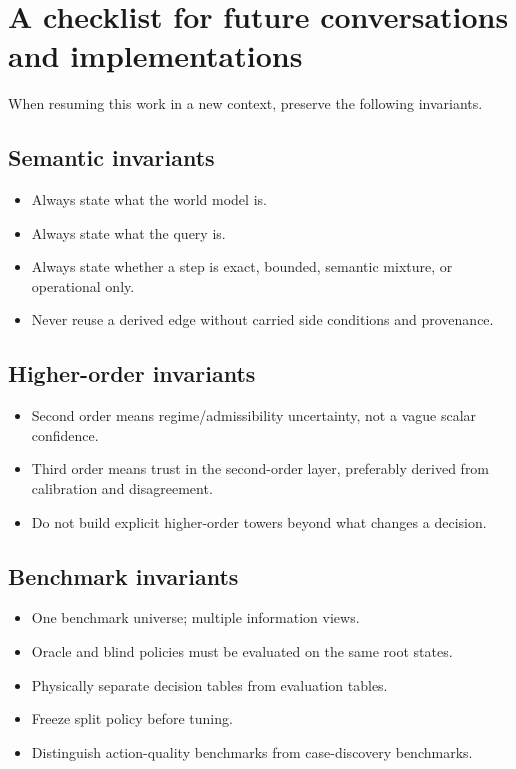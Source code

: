 \documentclass[11pt]{article}
\begin{document}
\section{A checklist for future conversations and implementations}
When resuming this work in a new context, preserve the following invariants.

\subsection*{Semantic invariants}
\begin{itemize}
    \item Always state what the world model is.
    \item Always state what the query is.
    \item Always state whether a step is exact, bounded, semantic mixture, or operational only.
    \item Never reuse a derived edge without carried side conditions and provenance.
\end{itemize}

\subsection*{Higher-order invariants}
\begin{itemize}
    \item Second order means regime/admissibility uncertainty, not a vague scalar confidence.
    \item Third order means trust in the second-order layer, preferably derived from calibration and disagreement.
    \item Do not build explicit higher-order towers beyond what changes a decision.
\end{itemize}

\subsection*{Benchmark invariants}
\begin{itemize}
    \item One benchmark universe; multiple information views.
    \item Oracle and blind policies must be evaluated on the same root states.
    \item Physically separate decision tables from evaluation tables.
    \item Freeze split policy before tuning.
    \item Distinguish action-quality benchmarks from case-discovery benchmarks.
\end{itemize}
\end{document}
